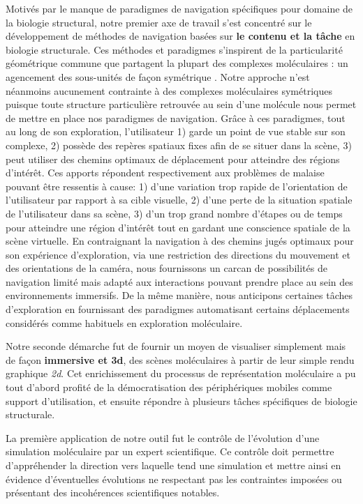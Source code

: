 Motivés par le manque de paradigmes de navigation spécifiques pour domaine de la biologie structural, notre premier axe de travail s'est concentré sur le développement de méthodes de navigation basées sur \textbf{le contenu et la tâche} en biologie structurale. Ces méthodes et paradigmes s'inspirent de la particularité géométrique commune que partagent la plupart des complexes moléculaires : un agencement des sous-unités de façon symétrique \cite{goodsell_structural_2000}. Notre approche n'est néanmoins aucunement contrainte à des complexes moléculaires symétriques puisque toute structure particulière retrouvée au sein d'une molécule nous permet de mettre en place nos paradigmes de navigation. Grâce à ces paradigmes, tout au long de son exploration, l'utilisateur 1) garde un point de vue stable sur son complexe, 2) possède des repères spatiaux fixes afin de se situer dans la scène, 3) peut utiliser des chemins optimaux de déplacement pour atteindre des régions d’intérêt. Ces apports répondent respectivement aux problèmes de malaise pouvant être ressentis à cause: 1) d'une variation trop rapide de l'orientation de l'utilisateur par rapport à sa cible visuelle, 2) d'une perte de la situation spatiale de l'utilisateur dans sa scène, 3) d'un trop grand nombre d'étapes ou de temps pour atteindre une région d'intérêt tout en gardant une conscience spatiale de la scène virtuelle. En contraignant la navigation à des chemins jugés optimaux pour son expérience d'exploration, via une restriction des directions du mouvement et des orientations de la caméra, nous fournissons un carcan de possibilités de navigation limité mais adapté aux interactions pouvant prendre place au sein des environnements immersifs. De la même manière, nous anticipons certaines tâches d'exploration en fournissant des paradigmes automatisant certains déplacements considérés comme habituels en exploration moléculaire.


Notre seconde démarche fut de fournir un moyen de visualiser simplement mais de façon \textbf{immersive et 3d}, des scènes moléculaires à partir de leur simple rendu graphique \textit{2d}. Cet enrichissement du processus de représentation moléculaire a pu tout d'abord profité de la démocratisation des périphériques mobiles comme support d'utilisation, et ensuite répondre à plusieurs tâches spécifiques de biologie structurale.

La première application de notre outil fut le contrôle de l'évolution d'une simulation moléculaire par un expert scientifique. Ce contrôle doit permettre d'appréhender la direction vers laquelle tend une simulation et mettre ainsi en évidence d'éventuelles évolutions ne respectant pas les contraintes imposées ou présentant des incohérences scientifiques notables. 

